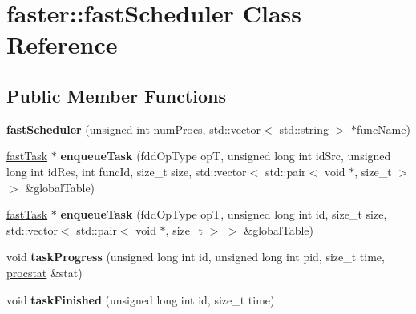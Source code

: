 \hypertarget{classfaster_1_1fastScheduler}{}\section{faster\+:\+:fast\+Scheduler Class Reference}
\label{classfaster_1_1fastScheduler}
\subsection*{Public Member Functions}
\begin{DoxyCompactItemize}
\item 
\hypertarget{classfaster_1_1fastScheduler_a5585b9363737823bf17e6782013b04a8}{}{\bfseries fast\+Scheduler} (unsigned int num\+Procs, std\+::vector$<$ std\+::string $>$ $\ast$func\+Name)\label{classfaster_1_1fastScheduler_a5585b9363737823bf17e6782013b04a8}

\item 
\hypertarget{classfaster_1_1fastScheduler_a91e01ea04fb7b0e58c48a04f6b8f572a}{}\hyperlink{classfaster_1_1fastTask}{fast\+Task} $\ast$ {\bfseries enqueue\+Task} (fdd\+Op\+Type op\+T, unsigned long int id\+Src, unsigned long int id\+Res, int func\+Id, size\+\_\+t size, std\+::vector$<$ std\+::pair$<$ void $\ast$, size\+\_\+t $>$ $>$ \&global\+Table)\label{classfaster_1_1fastScheduler_a91e01ea04fb7b0e58c48a04f6b8f572a}

\item 
\hypertarget{classfaster_1_1fastScheduler_a8bb0b7d5989b320016ab2c47517ea7fa}{}\hyperlink{classfaster_1_1fastTask}{fast\+Task} $\ast$ {\bfseries enqueue\+Task} (fdd\+Op\+Type op\+T, unsigned long int id, size\+\_\+t size, std\+::vector$<$ std\+::pair$<$ void $\ast$, size\+\_\+t $>$ $>$ \&global\+Table)\label{classfaster_1_1fastScheduler_a8bb0b7d5989b320016ab2c47517ea7fa}

\item 
\hypertarget{classfaster_1_1fastScheduler_a09db7fd6c9076e26dea68a7c925bf531}{}void {\bfseries task\+Progress} (unsigned long int id, unsigned long int pid, size\+\_\+t time, \hyperlink{classfaster_1_1procstat}{procstat} \&stat)\label{classfaster_1_1fastScheduler_a09db7fd6c9076e26dea68a7c925bf531}

\item 
\hypertarget{classfaster_1_1fastScheduler_af657bff84b9c117625135ca0c8f4ccf6}{}void {\bfseries task\+Finished} (unsigned long int id, size\+\_\+t time)\label{classfaster_1_1fastScheduler_af657bff84b9c117625135ca0c8f4ccf6}


\end{DoxyCompactItemize}
